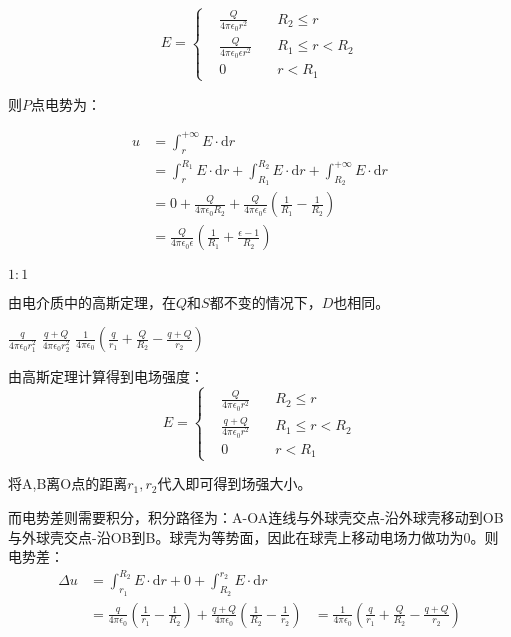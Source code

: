 \documentclass[b5paper,opensource]{qyxf-book}
\newcommand{\di}[1]{\mathrm{d}#1}
\begin{document}
\begin{equation}
E=\left\{
\begin{aligned}
&\frac{Q}{4\pi\epsilon_0 r^2}\quad &R_2\leqslant r\\
&\frac{Q}{4\pi\epsilon_0\epsilon r^2}\quad &R_1\leqslant r<R_2\\
&0	&r<R_1
\end{aligned}
\right.
\end{equation}

则$ P $点电势为：

\begin{align*}
u&=\int_r^{+\infty}E\cdot\di{r}\\
&=\int_r^{R_1}E\cdot\di{r}+\int_{R_1}^{R_2}E\cdot\di{r}+\int_{R_2}^{+\infty}E\cdot\di{r}\\
&=0+\frac{Q}{4\pi\epsilon_0 R_2}+\frac{Q}{4\pi\epsilon_0\epsilon}\left(\frac{1}{R_1}-\frac{1}{R_2}\right)\\
&=\frac{Q}{4\pi\epsilon_0\epsilon}\left(\frac{1}{R_1}+\frac{\epsilon-1}{R_2}\right)
\end{align*}

 $1:1$

\solve 由电介质中的高斯定理，在$ Q $和$ S $都不变的情况下，$ D $也相同。

 $\frac{q}{4\pi \epsilon_0 r_1^2}$ \quad $\frac{q+Q}{4\pi\epsilon_0 r_2^2}$ \quad $\frac{1}{4\pi\epsilon_0}\left(\frac{q}{r_1}+\frac{Q}{R_2}-\frac{q+Q}{r_2}\right)$

\solve 由高斯定理计算得到电场强度：
\begin{equation}
E=\left\{
\begin{aligned}
&\frac{Q}{4\pi\epsilon_0 r^2}\quad &R_2\leqslant r\\
&\frac{q+Q}{4\pi\epsilon_0 r^2}\quad &R_1\leqslant r<R_2\\
&0	&r<R_1
\end{aligned}
\right.
\end{equation}

将A,B离O点的距离$ r_1,r_2 $代入即可得到场强大小。

而电势差则需要积分，积分路径为：A-OA连线与外球壳交点-沿外球壳移动到OB与外球壳交点-沿OB到B。球壳为等势面，因此在球壳上移动电场力做功为0。则电势差：
\begin{align*}
\Delta u&=\int_{r_1}^{R_2}E\cdot\di{r}+0+\int_{R_2}^{r_2}E\cdot\di{r}\\
&=\frac{q}{4\pi\epsilon_0}\left(\frac{1}{r_1}-\frac{1}{R_2}\right)+\frac{q+Q}{4\pi\epsilon_0}\left(\frac{1}{R_2}-\frac{1}{r_2}\right)
&=\frac{1}{4\pi\epsilon_0}\left(\frac{q}{r_1}+\frac{Q}{R_2}-\frac{q+Q}{r_2}\right)
\end{align*}
\end{document}
